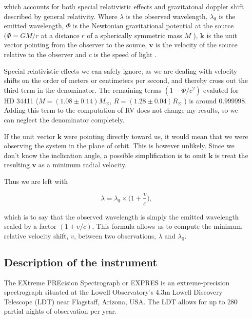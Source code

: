 which accounts for both special relativistic effects and gravitatonal doppler shift described by general relativity. Where $\lambda$ is the observed wavelength, $\lambda_0$ is the emitted wavelength, $\Phi$ is the Newtonian gravitational potential at the source $(\Phi=G M / r$ at a distance $r$ of a spherically symmetric mass $M$ ), $\textbf{k}$ is the unit vector pointing from the observer to the source, $\textbf{v}$ is the velocity of the source relative to the observer and $c$ is the speed of light \cite{doppler_shift_GR_formula}.

Special relativistic effects we can safely ignore, as we are dealing with velocity shifts on the order of meters or centimeters per second, and thereby cross out the third term in the denominator. The remaining terms $(1-\Phi/c^2)$ evaluted for HD 34411 ($M = (1.08 \pm 0.14) M_{\odot}$, $R = (1.28 \pm 0.04) R_{\odot}$ \cite{star_properties}) is around $0.999998$. Adding this term to the computation of RV does not change my results, so we can neglect the denominator completely. 

If the unit vector $\textbf{k}$ were pointing directly toward us, it would mean that we were observing the system in the plane of orbit. This is however unlikely. Since we don't know the inclication angle, a possible simplification is to omit $\textbf{k}$ is treat the resulting $\textbf{v}$ as a minimum radial velocity.

Thus we are left with 

\begin{equation}
    \label{eq:our_doppler}
    \lambda = \lambda_0 \times \Big(1 + \frac{v}{c} \Big),
\end{equation}

which is to say that the observed wavelength is simply the emitted wavelength scaled by a factor $(1 + v/c)$. This formula allows us to compute the minimum relative velocity shift, $v$, between two observations, $\lambda$ and $\lambda_0$.


\subsection{Description of the instrument}
The EXtreme PREcision Spectrograph or EXPRES is an extreme-precision spectrograph situated at the Lowell Observatory's 4.3m Lowell Discovery Telescope (LDT) near Flagstaff, Arizona, USA. The LDT allows for up to 280 partial nights of observation per year.

